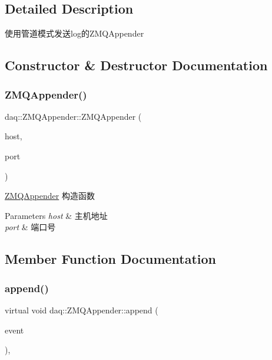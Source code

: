 \subsection{Detailed Description}
使用管道模式发送log的\+Z\+M\+Q\+Appender 

\subsection{Constructor \& Destructor Documentation}
\mbox{\label{classdaq_1_1ZMQAppender_a5c1c6cbb077ebfecf379a143fc129981}} 
\subsubsection{\texorpdfstring{Z\+M\+Q\+Appender()}{ZMQAppender()}}
{\footnotesize\ttfamily daq\+::\+Z\+M\+Q\+Appender\+::\+Z\+M\+Q\+Appender (\begin{DoxyParamCaption}\item[{const std\+::string \&}]{host,  }\item[{const std\+::string \&}]{port }\end{DoxyParamCaption})}



\hyperlink{classdaq_1_1ZMQAppender}{Z\+M\+Q\+Appender} 构造函数 


\begin{DoxyParams}{Parameters}
{\em host} & 主机地址 \\
\hline
{\em port} & 端口号 \\
\hline
\end{DoxyParams}


\subsection{Member Function Documentation}
\mbox{\label{classdaq_1_1ZMQAppender_a3b69d9f380daa18c2527be0fed4f2d11}} 
\subsubsection{\texorpdfstring{append()}{append()}}
{\footnotesize\ttfamily virtual void daq\+::\+Z\+M\+Q\+Appender\+::append (\begin{DoxyParamCaption}\item[{Log\+Event\+::sptr}]{event }\end{DoxyParamCaption})\hspace{0.3cm}{\ttfamily [override]}, {\ttfamily [virtual]}}



